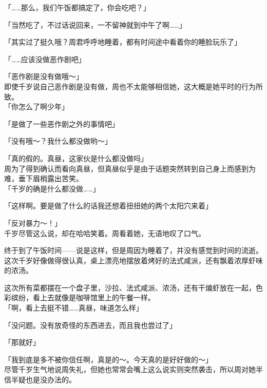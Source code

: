 「……那么，我们午饭都搞定了，你会吃吧？」

「当然吃了，不过话说回来，一不留神就到中午了啊……」

「其实过了挺久哦？周君呼呼地睡着，都有时间途中看着你的睡脸玩乐了」

「……应该没做恶作剧吧」

「恶作剧是没有做哦～」\\

即使千岁说自己恶作剧是没有做，周也不太能够相信她，这大概是她平时的行为所致。\\

「你怎么了啊少年」

「是做了一些恶作剧之外的事情吧」

「没有哦～？我什么都没做哟～」

「真的假的。真昼，这家伙是什么都没做吗」\\

周为了得到确认而看向真昼，但真昼似乎是由于话题突然转到自己身上而感到为难，垂下眉梢露出苦笑。\\

「千岁的确是什么都没做……」

「这样啊。要是做了什么的话我还想着扭扭她的两个太阳穴来着」

「反对暴力～！」\\

千岁尽管这么说，却在哈哈笑着。周看着她，无语地叹了口气。\\

\vspace{2\baselineskip}

终于到了午饭时间——说是这样，但是周因为睡着了，并没有感觉到时间的流逝。\\

这次千岁好像做得很认真，桌上漂亮地摆放着烤好的法式咸派，还有飘着浓厚虾味的浓汤。

这次所有菜都摆在一个盘子里，沙拉、法式咸派、浓汤，还有干煸虾放在一起，色彩缤纷，看上去就像是咖啡馆里上的午餐一样。\\

「啊，看上去挺不错……真昼，味道怎么样」

「没问题。没有放奇怪的东西进去，而且我也尝过了」

「那就好」

「我到底是多不被你信任啊，真是的～。今天真的是好好做的～」\\

尽管千岁生气地说周失礼，但她也常常会嘴上这么说实则突然袭击，所以周对她半信半疑也是没办法的。

